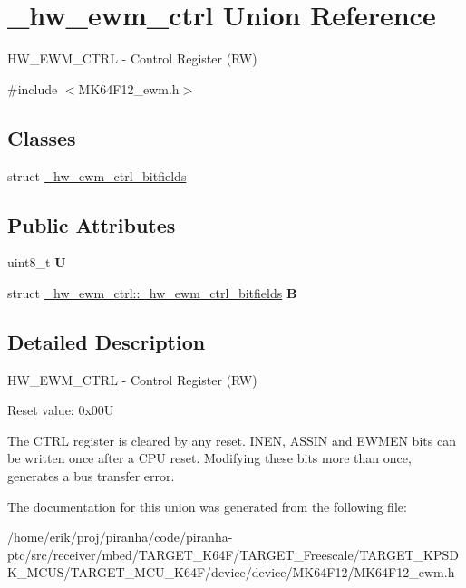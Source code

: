 \hypertarget{union__hw__ewm__ctrl}{}\section{\+\_\+hw\+\_\+ewm\+\_\+ctrl Union Reference}
\label{union__hw__ewm__ctrl}


H\+W\+\_\+\+E\+W\+M\+\_\+\+C\+T\+RL -\/ Control Register (RW)  




{\ttfamily \#include $<$M\+K64\+F12\+\_\+ewm.\+h$>$}

\subsection*{Classes}
\begin{DoxyCompactItemize}
\item 
struct \hyperlink{struct__hw__ewm__ctrl_1_1__hw__ewm__ctrl__bitfields}{\+\_\+hw\+\_\+ewm\+\_\+ctrl\+\_\+bitfields}
\end{DoxyCompactItemize}
\subsection*{Public Attributes}
\begin{DoxyCompactItemize}
\item 
uint8\+\_\+t {\bfseries U}\hypertarget{union__hw__ewm__ctrl_a0906a0f966b1ce2c48d3903f0e80a90c}{}\label{union__hw__ewm__ctrl_a0906a0f966b1ce2c48d3903f0e80a90c}

\item 
struct \hyperlink{struct__hw__ewm__ctrl_1_1__hw__ewm__ctrl__bitfields}{\+\_\+hw\+\_\+ewm\+\_\+ctrl\+::\+\_\+hw\+\_\+ewm\+\_\+ctrl\+\_\+bitfields} {\bfseries B}\hypertarget{union__hw__ewm__ctrl_a35c9fef4b689cc498a4f1eeb96bd275a}{}\label{union__hw__ewm__ctrl_a35c9fef4b689cc498a4f1eeb96bd275a}

\end{DoxyCompactItemize}


\subsection{Detailed Description}
H\+W\+\_\+\+E\+W\+M\+\_\+\+C\+T\+RL -\/ Control Register (RW) 

Reset value\+: 0x00U

The C\+T\+RL register is cleared by any reset. I\+N\+EN, A\+S\+S\+IN and E\+W\+M\+EN bits can be written once after a C\+PU reset. Modifying these bits more than once, generates a bus transfer error. 

The documentation for this union was generated from the following file\+:\begin{DoxyCompactItemize}
\item 
/home/erik/proj/piranha/code/piranha-\/ptc/src/receiver/mbed/\+T\+A\+R\+G\+E\+T\+\_\+\+K64\+F/\+T\+A\+R\+G\+E\+T\+\_\+\+Freescale/\+T\+A\+R\+G\+E\+T\+\_\+\+K\+P\+S\+D\+K\+\_\+\+M\+C\+U\+S/\+T\+A\+R\+G\+E\+T\+\_\+\+M\+C\+U\+\_\+\+K64\+F/device/device/\+M\+K64\+F12/M\+K64\+F12\+\_\+ewm.\+h\end{DoxyCompactItemize}
